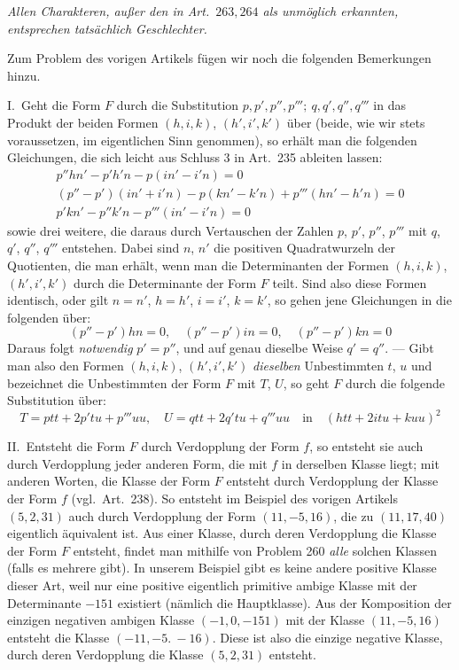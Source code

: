 \begin{center}
\textit{Allen Charakteren, außer den in Art.\ $263,264$ als unmöglich erkannten, entsprechen tatsächlich Geschlechter.}
\end{center}

Zum Problem des vorigen Artikels fügen wir noch die folgenden Bemerkungen hinzu.

I.\ Geht die Form $F$ durch die Substitution $p,p',p'',p''';\ q,q',q'',q'''$ in das Produkt
der beiden Formen $(h,i,k)$, $(h',i',k')$ über (beide, wie wir stets
voraussetzen, im eigentlichen Sinn genommen), so erhält man die folgenden
Gleichungen, die sich leicht aus Schluss 3 in Art.\ 235 ableiten lassen:
\[
\begin{gathered}
p''hn'-p'h'n-p(in'-i'n)=0\\
(p''-p')(in'+i'n)-p(kn'-k'n)+p'''(hn'-h'n)=0\\
p'kn'-p''k'n-p'''(in'-i'n)=0
\end{gathered}
\]
sowie drei weitere, die daraus durch Vertauschen der Zahlen $p$,
$p'$, $p''$, $p'''$ mit $q$, $q'$, $q''$, $q'''$ entstehen.
Dabei sind $n$, $n'$ die positiven Quadratwurzeln der Quotienten,
die man erhält, wenn man die Determinanten der Formen $(h,i,k)$, $(h',i',k')$
durch die Determinante der Form $F$ teilt. Sind also diese Formen
identisch, oder gilt $n=n'$, $h=h'$, $i=i'$, $k=k'$, so gehen jene
Gleichungen in die folgenden über:
\[
(p''-p')hn=0,\quad (p''-p')in=0,\quad (p''-p')kn=0
\]
Daraus folgt \textit{notwendig} $p'=p''$, und auf genau dieselbe Weise
$q'=q''$. --- Gibt man also den Formen $(h,i,k)$, $(h',i',k')$ \textit{dieselben}
Unbestimmten $t$, $u$ und bezeichnet die Unbestimmten der Form
$F$ mit $T$, $U$, so geht $F$ durch die folgende Substitution über:
\[
T=ptt+2p'tu+p'''uu,\quad U=qtt+2q'tu+q'''uu\quad\text{in}\quad (htt+2itu+kuu)^2
\]

II.\ Entsteht die Form $F$ durch Verdopplung der Form $f$, so
entsteht sie auch durch Verdopplung jeder anderen Form, die mit $f$
in derselben Klasse liegt; mit anderen Worten, die Klasse der Form $F$ entsteht
durch Verdopplung der Klasse der Form $f$ (vgl.\ Art.\ 238). So
entsteht im Beispiel des vorigen Artikels $(5,2,31)$ auch durch Verdopplung
der Form $(11,-5,16)$, die zu $(11,17,40)$ eigentlich äquivalent ist. Aus einer
Klasse, durch deren Verdopplung die Klasse der Form $F$ entsteht,
findet man mithilfe von Problem 260 \textit{alle} solchen Klassen
(falls es mehrere gibt). In unserem Beispiel gibt es keine andere
positive Klasse dieser Art, weil nur eine positive eigentlich primitive
ambige Klasse mit der Determinante $-151$ existiert (nämlich die
Hauptklasse). Aus der Komposition der einzigen negativen ambigen Klasse
$(-1,0,-151)$ mit der Klasse $(11,-5,16)$ entsteht die Klasse $(-11,-5.\ -16)$. Diese ist
also die einzige negative Klasse, durch deren Verdopplung die Klasse
$(5,2,31)$ entsteht.

